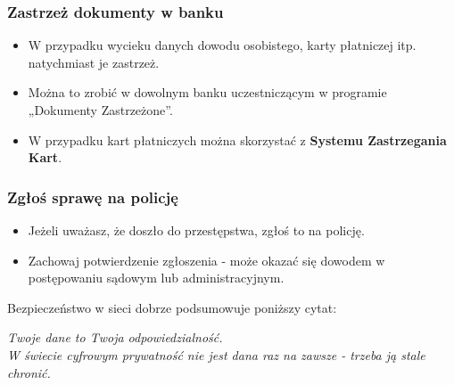 \subsubsection{Zastrzeż dokumenty w banku}
\begin{itemize}
    \item W przypadku wycieku danych dowodu osobistego, karty płatniczej itp. natychmiast je zastrzeż.
    \item Można to zrobić w dowolnym banku uczestniczącym w programie „Dokumenty Zastrzeżone”.
    \item W przypadku kart płatniczych można skorzystać z \textbf{Systemu Zastrzegania Kart}.
\end{itemize}

\subsubsection{Zgłoś sprawę na policję}
\begin{itemize}
    \item Jeżeli uważasz, że doszło do przestępstwa, zgłoś to na policję.
    \item Zachowaj potwierdzenie zgłoszenia - może okazać się dowodem w postępowaniu sądowym lub administracyjnym.
\end{itemize}

Bezpieczeństwo w sieci dobrze podsumowuje poniższy cytat:
\begin{center}
\textit{Twoje dane to Twoja odpowiedzialność.\\
W świecie cyfrowym prywatność nie jest dana raz na zawsze - trzeba ją stale chronić.}
\end{center}